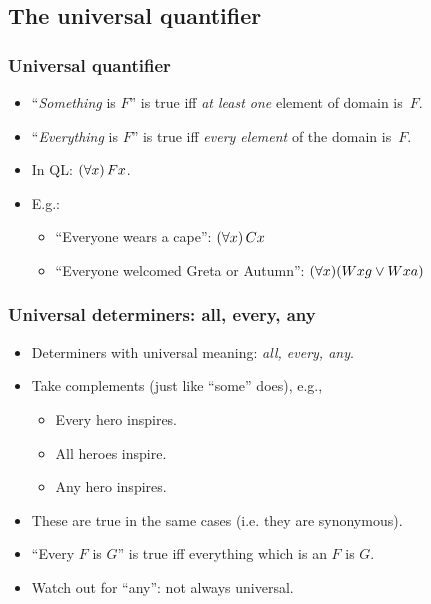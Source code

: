 \subsection{The universal quantifier}

\begin{frame}
\frametitle{Universal quantifier}

\begin{itemize}[<+->]
  \item ``\emph{Something} is $F$'' is true iff \emph{at least one} element of domain
  is~$F$.
  \item ``\emph{Everything} is $F$'' is true iff \emph{every element} of the domain
  is~$F$.
  \item In QL: $(\forall x)\, Fx$.
  \item E.g.:
    \begin{itemize}
      \item ``Everyone wears a cape'': \alert{$(\forall x)\,Cx$}
      \item ``Everyone welcomed Greta or Autumn'': \alert{$(\forall 
      x)(Wxg \vee Wxa)$}
    \end{itemize}
\end{itemize}
\end{frame}

\begin{frame}
\frametitle{Universal determiners: all, every, any}

\begin{itemize}[<+->]
  \item Determiners with universal meaning: \emph{all, every, any}.
  \item Take complements (just like ``some'' does), e.g.,
      \begin{itemize}[<+->]
        \item \alert{Every hero} inspires.
        \item \alert{All heroes} inspire.
        \item \alert{Any hero} inspires.
      \end{itemize}

\bigskip

  \item These are true in the same cases (i.e. they are synonymous).
  \item ``Every $F$ is $G$'' is true iff everything \alert{which is an
  $F$} is $G$.
  \item Watch out for ``any'': not always universal.
\end{itemize}
\end{frame}

